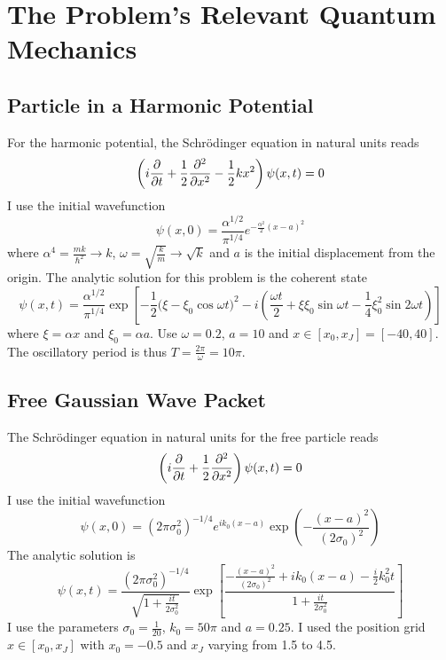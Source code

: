 \documentclass[11pt, a4paper]{article}
\newcommand{\schro}{Schr\"{o}dinger\xspace}
\begin{document}
\section{The Problem's Relevant Quantum Mechanics}
\subsection{Particle in a Harmonic Potential}
For the harmonic potential, the \schro equation in natural units reads
\begin{equation*}
	\left(i \pdv{t} + \frac{1}{2}\pdv[2]{}{x} - \frac{1}{2}kx^{2} \right) \psi(x, t) = 0
\end{equation*}
I use the initial wavefunction
\begin{equation*}
	\psi(x, 0) = \frac{\alpha^{1/2}}{\pi^{1/4}}e^{-\frac{\alpha^{2}}{2}(x - a)^{2}}
\end{equation*}
where $ \alpha^{4} = \frac{mk}{\hbar^{2}} \to k $, $ \omega = \sqrt{\frac{k}{m}} \to \sqrt{k} $ and $ a $ is the initial displacement from the origin. The analytic solution for this problem is the coherent state
\begin{equation*}
	\psi(x, t) = \frac{\alpha^{1/2}}{\pi^{1/4}}\exp \left[-\frac{1}{2}\big(\xi - \xi_{0}\cos \omega t \big)^{2} - i\left(\frac{\omega t}{2} + \xi \xi_{0} \sin \omega t - \frac{1}{4}\xi_{0}^{2}\sin 2\omega t\right)\right]
\end{equation*}
where $ \xi = \alpha x $ and $ \xi_{0} = \alpha a $. Use $ \omega = 0.2 $, $ a = 10 $ and $ x \in [x_{0}, x_{J}] = [-40, 40] $. The oscillatory period is thus $ T = \frac{2\pi}{\omega} = 10\pi $.


\subsection{Free Gaussian Wave Packet}
The \schro equation in natural units for the free particle reads
\begin{equation*}
	\left(i \pdv{t} + \frac{1}{2}\pdv[2]{}{x}\right) \psi(x, t) = 0
\end{equation*}
I use the initial wavefunction
\begin{equation*}
	\psi(x, 0) = (2\pi \sigma_{0}^{2})^{-1/4}e^{ik_{0}(x - a)}\exp(-\frac{(x - a)^{2}}{(2\sigma_{0})^{2}})
\end{equation*}
The analytic solution is
\begin{equation*}
	\psi(x, t) = \frac{(2\pi \sigma_{0}^{2})^{-1/4}}{\sqrt{1 + \frac{it}{2\sigma_{0}^{2}}}} \exp \left[\frac{-\frac{(x-a)^{2}}{(2\sigma_{0})^{2}} + ik_{0}(x-a) - \tfrac{i}{2}k_{0}^{2}t}{1 + \frac{it}{2\sigma_{0}^{2}}}\right]
\end{equation*}
I use the parameters $ \sigma_{0} = \frac{1}{20} $, $ k_{0} = 50 \pi $ and $ a = 0.25 $. I used the position grid $ x \in [x_{0}, x_{J}] $ with $ x_{0} = -0.5 $ and $ x_{J} $ varying from 1.5 to 4.5. 
\end{document}
